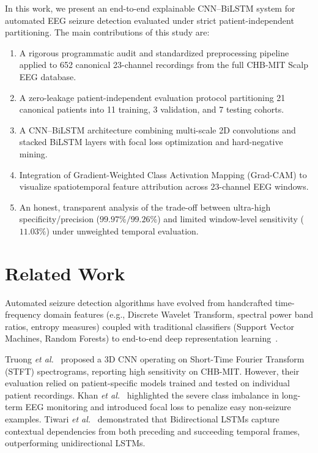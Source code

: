 \documentclass[conference]{IEEEtran}
\begin{document}
In this work, we present an end-to-end explainable CNN--BiLSTM system for automated EEG seizure detection evaluated under strict patient-independent partitioning. The main contributions of this study are:
\begin{enumerate}
    \item A rigorous programmatic audit and standardized preprocessing pipeline applied to 652 canonical 23-channel recordings from the full CHB-MIT Scalp EEG database.
    \item A zero-leakage patient-independent evaluation protocol partitioning 21 canonical patients into 11 training, 3 validation, and 7 testing cohorts.
    \item A CNN--BiLSTM architecture combining multi-scale 2D convolutions and stacked BiLSTM layers with focal loss optimization and hard-negative mining.
    \item Integration of Gradient-Weighted Class Activation Mapping (Grad-CAM) to visualize spatiotemporal feature attribution across 23-channel EEG windows.
    \item An honest, transparent analysis of the trade-off between ultra-high specificity/precision ($99.97\% / 99.26\%$) and limited window-level sensitivity ($11.03\%$) under unweighted temporal evaluation.
\end{enumerate}

\section{Related Work}
Automated seizure detection algorithms have evolved from handcrafted time-frequency domain features (e.g., Discrete Wavelet Transform, spectral power band ratios, entropy measures) coupled with traditional classifiers (Support Vector Machines, Random Forests) to end-to-end deep representation learning~\cite{shoeibi2021epileptic}. 

Truong \textit{et al.}~\cite{truong2019generalized} proposed a 3D CNN operating on Short-Time Fourier Transform (STFT) spectrograms, reporting high sensitivity on CHB-MIT. However, their evaluation relied on patient-specific models trained and tested on individual patient recordings. Khan \textit{et al.}~\cite{khan2021focal} highlighted the severe class imbalance in long-term EEG monitoring and introduced focal loss to penalize easy non-seizure examples. Tiwari \textit{et al.}~\cite{tiwari2021bilstm} demonstrated that Bidirectional LSTMs capture contextual dependencies from both preceding and succeeding temporal frames, outperforming unidirectional LSTMs.
\end{document}
